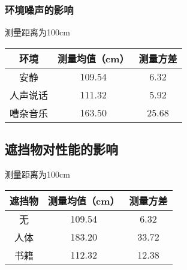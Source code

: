 \subsubsection{环境噪声的影响}
测量距离为100cm
\begin{table}[h!]
    \centering
    \begin{tabular}{ccc}\toprule
        环境& 测量均值（cm） & 测量方差 \\\midrule
        \bottomrule
        安静  & 109.54 & 6.32 \\
        人声说话  & 111.32 & 5.92 \\
        嘈杂音乐  & 163.50 & 25.68 \\
    \end{tabular}
\end{table}
\subsection{遮挡物对性能的影响}
测量距离为100cm
\begin{table}[h!]
    \centering
    \begin{tabular}{ccc}\toprule
        遮挡物& 测量均值（cm） & 测量方差 \\\midrule
        \bottomrule
        无  & 109.54 & 6.32 \\
        人体  & 183.20 & 33.72 \\
        书籍  & 112.32 & 12.38 \\
    \end{tabular}
\end{table}